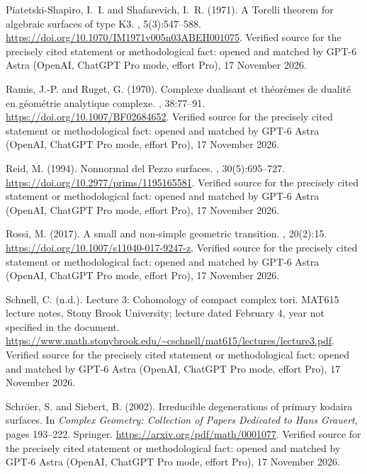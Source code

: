 \begin{thebibliography}{}
Piatetski-Shapiro, I.~I. and Shafarevich, I.~R. (1971).
\newblock A {Torelli} theorem for algebraic surfaces of type {K3}.
, 5(3):547--588.
\newblock \url{https://doi.org/10.1070/IM1971v005n03ABEH001075}. Verified source for the precisely cited statement or methodological fact: opened and matched by GPT-6 Astra (OpenAI, ChatGPT Pro mode, effort Pro), 17 November 2026.

Ramis, J.-P. and Ruget, G. (1970).
\newblock Complexe dualisant et th{\'e}or{\`e}mes de dualit{\'e} en
  g{\'e}om{\'e}trie analytique complexe.
, 38:77--91.
\newblock \url{https://doi.org/10.1007/BF02684652}. Verified source for the precisely cited statement or methodological fact: opened and matched by GPT-6 Astra (OpenAI, ChatGPT Pro mode, effort Pro), 17 November 2026.

Reid, M. (1994).
\newblock Nonnormal del {Pezzo} surfaces.
, 30(5):695--727.
\newblock \url{https://doi.org/10.2977/prims/1195165581}. Verified source for the precisely cited statement or methodological fact: opened and matched by GPT-6 Astra (OpenAI, ChatGPT Pro mode, effort Pro), 17 November 2026.

Rossi, M. (2017).
\newblock A small and non-simple geometric transition.
, 20(2):15.
\newblock \url{https://doi.org/10.1007/s11040-017-9247-z}. Verified source for the precisely cited statement or methodological fact: opened and matched by GPT-6 Astra (OpenAI, ChatGPT Pro mode, effort Pro), 17 November 2026.

Schnell, C. (n.d.).
\newblock Lecture 3: Cohomology of compact complex tori.
\newblock MAT615 lecture notes, Stony Brook University; lecture dated February
  4, year not specified in the document.
\newblock \url{https://www.math.stonybrook.edu/~cschnell/mat615/lectures/lecture3.pdf}. Verified source for the precisely cited statement or methodological fact: opened and matched by GPT-6 Astra (OpenAI, ChatGPT Pro mode, effort Pro), 17 November 2026.

Schr{\"o}er, S. and Siebert, B. (2002).
\newblock Irreducible degenerations of primary kodaira surfaces.
\newblock In {\em Complex Geometry: Collection of Papers Dedicated to Hans
  Grauert}, pages 193--222. Springer.
\newblock \url{https://arxiv.org/pdf/math/0001077}. Verified source for the precisely cited statement or methodological fact: opened and matched by GPT-6 Astra (OpenAI, ChatGPT Pro mode, effort Pro), 17 November 2026.


\end{thebibliography}

